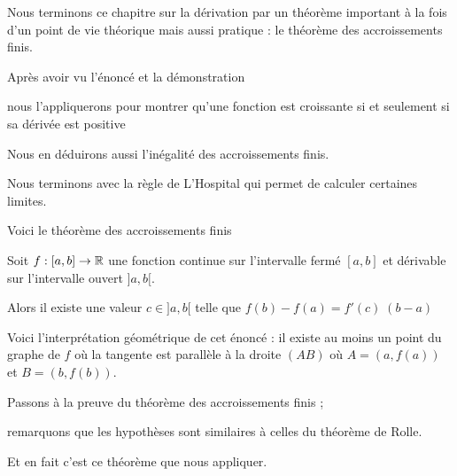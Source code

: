 







\debuttexte

\diapo

\change

Nous terminons ce chapitre sur la dérivation par un théorème important 
à la fois d'un point de vie théorique mais aussi pratique : le théorème des accroissements finis.

\change

Après avoir vu l'énoncé et la démonstration 

\change

nous l'appliquerons pour montrer qu'une fonction est croissante si et seulement si sa dérivée est positive

\change

Nous en déduirons aussi l'inégalité des accroissements finis.

\change

Nous terminons avec la règle de L'Hospital qui permet de calculer certaines limites.

\diapo

Voici le théorème des accroissements finis

Soit $f:[a,b] \to \mathbb{R}$ une fonction continue sur l'intervalle fermé $[a,b]$ 
et dérivable sur l'intervalle ouvert $]a,b[$.

Alors il existe une valeur $c\in]a,b[$ telle que 
$f(b)-f(a)= f'(c) \; (b-a)$

\change

Voici l'interprétation géométrique de cet énoncé : 
il existe au moins un point du graphe de $f$ où la tangente est 
parallèle à la droite $(AB)$ où $A=(a,f(a))$ et $B=(b,f(b))$.


\diapo

Passons à la preuve du théorème des accroissements finis ;

remarquons que les hypothèses sont similaires à celles du théorème de Rolle.

Et en fait c'est ce théorème que nous appliquer.

\change

